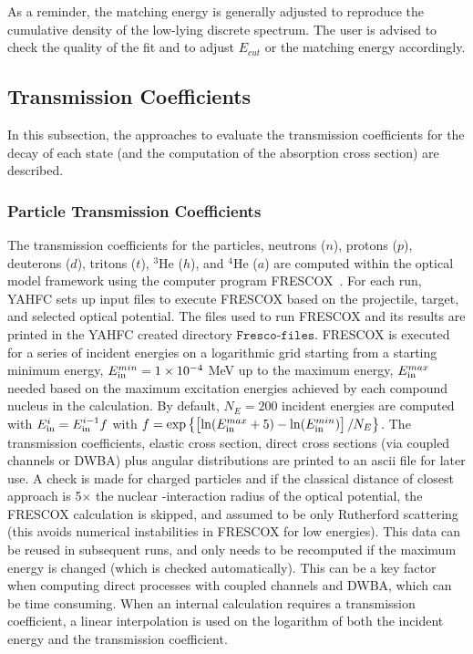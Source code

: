 \documentclass[
10pt,
showpacs,preprintnumbers,footinbib,
amsfonts,amsmath,amssymb,
aps,
prc,twocolumn,groupedaddress,superscriptaddress,
showkeys,
nofootinbib
]{revtex4-1}
\begin{document}
As a reminder, the matching energy is generally adjusted to reproduce the cumulative density of the low-lying discrete spectrum. The user is advised to check the quality of the fit and to adjust $E_{cut}$ or the matching energy accordingly. 

\subsection{Transmission Coefficients}

In this subsection, the approaches to evaluate the transmission coefficients for the decay of each state (and the computation of the absorption cross section) are described.

\subsubsection{Particle Transmission Coefficients}

The transmission coefficients for the particles, neutrons ($n$), protons ($p$), deuterons ($d$), tritons ($t$), $^3$He ($h$), and $^4$He ($a$) are computed within the optical model framework using the computer program FRESCOX~\cite{FRESCO}. For each run, YAHFC sets up input files to execute FRESCOX based on the projectile, target, and selected optical potential. The files used to run FRESCOX and its results are printed in the YAHFC created directory ${\texttt{Fresco-files}}$. FRESCOX is executed for a series of incident energies on a logarithmic grid starting from a starting minimum energy, $E_{\rm in}^{min} =1\times 10^{-4}$ MeV up to the maximum energy, $E_{\rm in}^{max}$ needed based on the maximum excitation energies achieved by each compound nucleus in the calculation. By default, $N_E=200$ incident energies are computed with $E_{\rm in}^i = E_{\rm in}^{i-1}f$ with 
$ f = \exp \left \{ \left [ \ln(E_{\rm in}^{max} + 5) - \ln(E_{\rm in}^{min}) \right ]/N_E \right \}$. The transmission coefficients, elastic cross section, direct cross sections (via coupled channels or DWBA) plus angular distributions are printed to an ascii file for later use. A check is made for charged particles and if the classical distance of closest approach is 5$\times$ the nuclear -interaction radius of the optical potential, the FRESCOX calculation is skipped, and assumed to be only Rutherford scattering (this avoids numerical instabilities in FRESCOX for low energies).  This data can be reused in subsequent runs, and only needs to be recomputed if the maximum energy is changed (which is checked automatically). This can be a key factor when computing direct processes with coupled channels and DWBA, which can be time consuming. When an internal calculation requires a transmission coefficient, a linear interpolation is used on the logarithm of both the incident energy and the transmission coefficient. 
\end{document}
